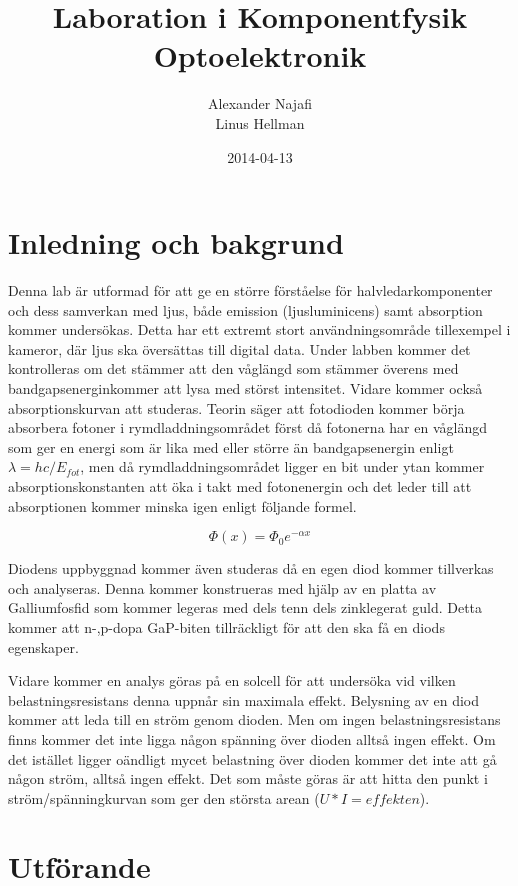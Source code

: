 \documentclass[a4paper]{article}
\title{Laboration i Komponentfysik\\ Optoelektronik}
\author{Alexander Najafi \\ Linus Hellman}
\date{2014-04-13}
\begin{document}
\maketitle
\thispagestyle{empty}
\newpage

\tableofcontents
\newpage

\section{Inledning och bakgrund}

Denna lab är utformad för att ge en större förståelse för halvledarkomponenter och dess samverkan med ljus, både emission (ljusluminicens) samt absorption kommer undersökas. Detta har ett extremt stort användningsområde tillexempel i kameror, där ljus ska översättas till digital data. Under labben kommer det kontrolleras om det stämmer att den våglängd som stämmer överens med bandgapsenerginkommer att lysa med störst intensitet. Vidare kommer också absorptionskurvan att studeras. Teorin säger att fotodioden kommer börja absorbera fotoner i rymdladdningsområdet först då fotonerna har en våglängd som ger en energi som är lika med eller större än bandgapsenergin enligt $\lambda = hc/E_{fot}$, men då rymdladdningsområdet ligger en bit under ytan kommer absorptionskonstanten att öka i takt med fotonenergin och det leder till att absorptionen kommer minska igen enligt följande formel.

\begin{equation}
  \Phi(x) =\Phi_0e^{-\alpha x}
\end{equation}

Diodens uppbyggnad kommer även studeras då en egen diod kommer tillverkas och analyseras. Denna kommer konstrueras med hjälp av en platta av Galliumfosfid som kommer legeras med dels tenn dels zinklegerat guld. Detta kommer att n-,p-dopa GaP-biten tillräckligt för att den ska få en diods egenskaper. 

Vidare kommer en analys göras på en solcell för att undersöka vid vilken belastningsresistans denna uppnår sin maximala effekt. Belysning av en diod kommer att leda till en ström genom dioden. Men om ingen belastningsresistans finns kommer det inte ligga någon spänning över dioden alltså ingen effekt. Om det istället ligger oändligt mycet belastning över dioden kommer det inte att gå någon ström, alltså ingen effekt. Det som måste göras är att hitta den punkt i ström/spänningkurvan som ger den största arean ($U*I=effekten$).
\section{Utförande}
\end{document}
